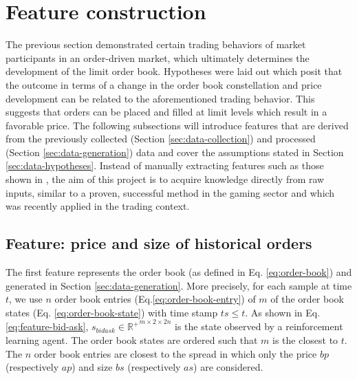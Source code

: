 \section{Feature construction}
\label{sec:feature-engineering}
The previous section demonstrated certain trading behaviors of market participants in an order-driven market, which ultimately determines the development of the limit order book. 
Hypotheses were laid out which posit that the outcome in terms of a change in the order book constellation and price development can be related to the aforementioned trading behavior.
This suggests that orders can be placed and filled at limit levels which result in a favorable price.
The following subsections will introduce features that are derived from the previously collected (Section \ref{sec:data-collection}) and processed (Section \ref{sec:data-generation}) data and cover the assumptions stated in Section \ref{sec:data-hypotheses}.
Instead of manually extracting features such as those shown in \cite{nevmyvaka2006reinforcement, hwangdeep, fletcher2010multiple}, the aim of this project is to acquire knowledge directly from raw inputs, similar to a proven, successful method in the gaming sector\cite{mnih2013playing} and which was recently applied in the trading context\cite{lu2017agent}.

\subsection{Feature: price and size of historical orders}
\label{sec:data-feature-1}

The first feature represents the order book (as defined in Eq. \ref{eq:order-book}) and generated in Section \ref{sec:data-generation}.
More precisely, for each sample at time $t$, we use $n$ order book entries (Eq.\ref{eq:order-book-entry}) of $m$ of the order book states (Eq. \ref{eq:order-book-state}) with time stamp $ts \le t$.
As shown in Eq. \ref{eq:feature-bid-ask}, $s_{bidask} \in \mathbb{R^+}^{m\times2\times2n}$ is the state observed by a reinforcement learning agent.
The order book states are ordered such that $m$ is the closest to $t$.
The $n$ order book entries are closest to the spread in which only the price $bp$ (respectively $ap$) and size $bs$ (respectively $as$) are considered.

